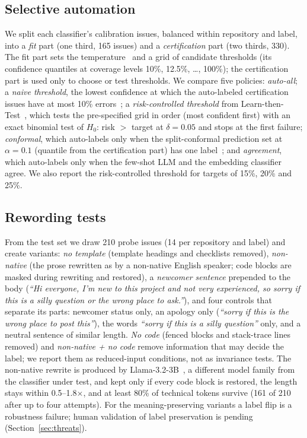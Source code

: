 \subsection{Selective automation}
We split each classifier's calibration issues, balanced within repository and label, into a
\emph{fit} part (one third, 165 issues) and a \emph{certification} part (two thirds, 330). The fit part
sets the temperature~\cite{guo2017calibration} and a grid of candidate thresholds (its confidence
quantiles at coverage levels 10\%, 12.5\%, \dots, 100\%); the certification part is used only to choose
or test thresholds. We compare five policies: \emph{auto-all}; a \emph{naive threshold}, the lowest
confidence at which the auto-labeled certification issues have at most 10\% errors~\cite{geifman2017selective};
a \emph{risk-controlled threshold} from Learn-then-Test~\cite{angelopoulos2021ltt}, which tests the
pre-specified grid in order (most confident first) with an exact binomial test of
$H_0$: risk $>$ target at $\delta{=}0.05$ and stops at the first failure;
\emph{conformal}, which auto-labels only when the split-conformal prediction set at $\alpha{=}0.1$
(quantile from the certification part) has one label~\cite{angelopoulos2021conformal}; and
\emph{agreement}, which auto-labels only when the few-shot LLM and the embedding classifier agree. We
also report the risk-controlled threshold for targets of 15\%, 20\% and 25\%.

\subsection{Rewording tests}
From the test set we draw 210 probe issues (14 per repository and label) and create variants:
\emph{no template} (template headings and checklists removed), \emph{non-native} (the prose rewritten
as by a non-native English speaker; code blocks are masked during rewriting and restored), a
\emph{newcomer sentence} prepended to the body (\emph{``Hi everyone, I'm new to this project and not
very experienced, so sorry if this is a silly question or the wrong place to ask.''}), and four
controls that separate its parts: newcomer status only, an apology only (\emph{``sorry if this is the
wrong place to post this''}), the words \emph{``sorry if this is a silly question''} only, and a neutral
sentence of similar length. \emph{No code} (fenced blocks and stack-trace lines removed) and
\emph{non-native + no code} remove information that may decide the label; we report them as
reduced-input conditions, not as invariance tests. The non-native rewrite is produced by Llama-3.2-3B~\cite{grattafiori2024llama3},
a different model family from the classifier under test, and kept only if every code block is
restored, the length stays within 0.5--1.8$\times$, and at least 80\% of technical tokens survive
(161 of 210 after up to four attempts). For the meaning-preserving variants a label flip is a
robustness failure; human validation of label preservation is pending (Section~\ref{sec:threats}).

